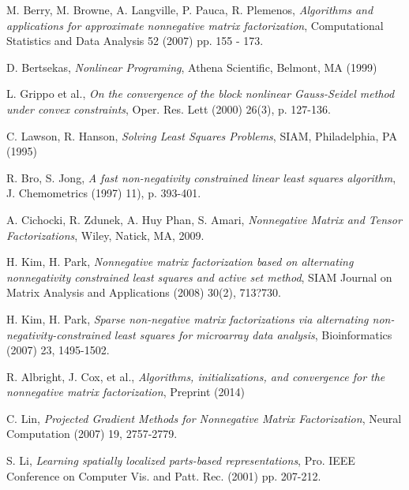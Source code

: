 \documentclass[final,leqno,onefignum,onetabnum]{siamltex1213}
\begin{document}
\begin{thebibliography}{1}
 {\sc M. Berry, M. Browne, A. Langville, P. Pauca, R. Plemenos},
{\em Algorithms and applications for approximate nonnegative matrix factorization}, Computational Statistics and Data Analysis 52 (2007) pp. 155 - 173.

 {\sc D. Bertsekas},
{\em Nonlinear Programing}, Athena Scientific, Belmont, MA (1999)

 {\sc L. Grippo et al.},
{\em On the convergence of the block nonlinear Gauss-Seidel method under convex constraints}, Oper. Res. Lett (2000) 26(3), p. 127-136.

 {\sc C. Lawson, R. Hanson},
{\em Solving Least Squares Problems}, SIAM, Philadelphia, PA (1995)

 {\sc R. Bro, S. Jong},
{\em A fast non-negativity constrained linear least squares algorithm}, J. Chemometrics (1997) 11), p. 393-401.

 {\sc A. Cichocki, R. Zdunek, A. Huy Phan, S. Amari}, {\em Nonnegative Matrix and Tensor Factorizations}, Wiley, Natick, MA, 2009.

 {\sc H. Kim, H. Park}, {\em Nonnegative matrix factorization based on alternating nonnegativity constrained least squares and active set method}, SIAM Journal on Matrix Analysis and Applications (2008) 30(2), 713?730.

 {\sc H. Kim, H. Park}, {\em Sparse non-negative matrix factorizations via alternating non-negativity-constrained least squares for microarray data analysis}, Bioinformatics (2007) 23, 1495-1502. 

 {\sc R. Albright, J. Cox, et al.},
{\em Algorithms, initializations, and convergence for the nonnegative matrix factorization}, Preprint (2014)

 {\sc C. Lin},
{\em Projected Gradient Methods for Nonnegative Matrix Factorization}, Neural Computation (2007) 19, 2757-2779. 

 {\sc S. Li},
{\em Learning spatially localized parts-based representations}, Pro. IEEE Conference on Computer Vis. and Patt. Rec. (2001) pp. 207-212. 

\end{thebibliography}
\end{document}
